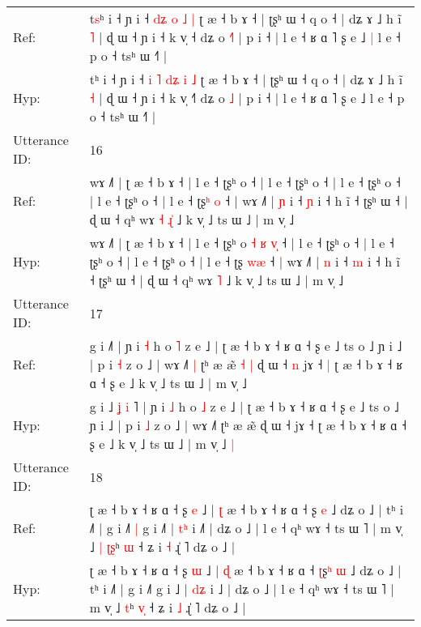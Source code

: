 \documentclass[10pt]{article}
\DeclareRobustCommand{\hl}[1]{{\textcolor{red}{#1}}}
\begin{document}
\begin{longtable}{ll}
Ref: & t\hl{s}ʰ i ˧ ɲ i ˧ \hl{}\hl{d}\hl{ʑ} \hl{}\hl{o} \hl{˩} \hl{|} ʈ æ ˧ b ɤ ˧ | ʈʂʰ ɯ ˧ q o ˧ | dʑ ɤ ˩ h ĩ \hl{˥} | ɖ ɯ ˧ ɲ i ˧ k v̩ ˧\hl{} dʑ o \hl{˧}\hl{˥} | p i ˧ | l e ˧ ʁ ɑ ˥ ʂ e ˩\hl{ }\hl{|} l e ˧ p o ˧ tsʰ ɯ ˧˥ |
 \\
Hyp: & t\hl{}ʰ i ˧ ɲ i ˧ \hl{i}\hl{ }\hl{˥} \hl{d}\hl{ʑ} \hl{i} \hl{˩} ʈ æ ˧ b ɤ ˧ | ʈʂʰ ɯ ˧ q o ˧ | dʑ ɤ ˩ h ĩ \hl{˧} | ɖ ɯ ˧ ɲ i ˧ k v̩ ˧\hl{˥} dʑ o \hl{}\hl{˩} | p i ˧ | l e ˧ ʁ ɑ ˥ ʂ e ˩\hl{}\hl{} l e ˧ p o ˧ tsʰ ɯ ˧˥ |
 \\
\midrule
Utterance ID: & 16 \\
Ref: & wɤ ˩˥ | ʈ æ ˧ b ɤ ˧ | l e ˧ ʈʂʰ o\hl{}\hl{}\hl{}\hl{}\hl{}\hl{}\hl{} ˧ | l e ˧ ʈʂʰ o ˧ | l e ˧ ʈʂʰ o ˧ | l e ˧ ʈʂʰ o ˧ | l e ˧ ʈʂ\hl{ʰ}\hl{ }\hl{o} ˧ | wɤ ˩˥ | \hl{ɲ} i ˧ \hl{ɲ} i ˧ h ĩ ˧ ʈʂʰ ɯ ˧ | ɖ ɯ ˧ qʰ wɤ\hl{ }\hl{˧} \hl{ɻ}\hl{̍} ˩ k v̩ ˩ ts ɯ ˩ | m v̩ ˩
 \\
Hyp: & wɤ ˩˥ | ʈ æ ˧ b ɤ ˧ | l e ˧ ʈʂʰ o\hl{ }\hl{˧}\hl{ }\hl{ʁ}\hl{ }\hl{v}\hl{̩} ˧ | l e ˧ ʈʂʰ o ˧ | l e ˧ ʈʂʰ o ˧ | l e ˧ ʈʂʰ o ˧ | l e ˧ ʈʂ\hl{ }\hl{w}\hl{æ} ˧ | wɤ ˩˥ | \hl{n} i ˧ \hl{m} i ˧ h ĩ ˧ ʈʂʰ ɯ ˧ | ɖ ɯ ˧ qʰ wɤ\hl{}\hl{} \hl{}\hl{˥} ˩ k v̩ ˩ ts ɯ ˩ | m v̩ ˩
 \\
\midrule
Utterance ID: & 17 \\
Ref: & g i ˩\hl{}\hl{}\hl{}\hl{}\hl{}˥ | ɲ i \hl{˧} h o \hl{˥} z e ˩ | ʈ æ ˧ b ɤ ˧ ʁ ɑ ˧ ʂ e ˩ ts o ˩ ɲ i ˩ | p i \hl{˧} z o ˩ | wɤ ˩˥\hl{ }\hl{|} ʈʰ æ æ̃\hl{ }\hl{˧}\hl{ }\hl{|} ɖ ɯ ˧\hl{ }\hl{n} jɤ ˧\hl{ }\hl{|} ʈ æ ˧ b ɤ ˧ ʁ ɑ ˧ ʂ e ˩ k v̩ ˩ ts ɯ ˩ | m v̩ ˩\hl{}\hl{}
 \\
Hyp: & g i ˩\hl{ }\hl{ʝ}\hl{ }\hl{i}\hl{ }˥ | ɲ i \hl{˩} h o \hl{˩} z e ˩ | ʈ æ ˧ b ɤ ˧ ʁ ɑ ˧ ʂ e ˩ ts o ˩ ɲ i ˩ | p i \hl{˩} z o ˩ | wɤ ˩˥\hl{}\hl{} ʈʰ æ æ̃\hl{}\hl{}\hl{}\hl{} ɖ ɯ ˧\hl{}\hl{} jɤ ˧\hl{}\hl{} ʈ æ ˧ b ɤ ˧ ʁ ɑ ˧ ʂ e ˩ k v̩ ˩ ts ɯ ˩ | m v̩ ˩\hl{ }\hl{|}
 \\
\midrule
Utterance ID: & 18 \\
Ref: & ʈ æ ˧ b ɤ ˧ ʁ ɑ ˧ ʂ \hl{e} ˩ | \hl{ʈ} æ ˧ b ɤ ˧ ʁ ɑ ˧ \hl{}ʂ\hl{} \hl{e} ˩ dʑ o ˩ | tʰ i ˩˥ | g i ˩˥\hl{ }\hl{|} g i ˩\hl{˥} | \hl{t}\hl{ʰ} i ˩\hl{˥} | dʑ o ˩ | l e ˧ qʰ wɤ ˧ ts ɯ ˥ | m v̩ ˩\hl{ }\hl{|} \hl{ʈ}\hl{ʂ}ʰ \hl{}\hl{ɯ} ˧ ʑ i \hl{˧} ɻ̍ ˥ dʑ o ˩ |
 \\
Hyp: & ʈ æ ˧ b ɤ ˧ ʁ ɑ ˧ ʂ \hl{ɯ} ˩ | \hl{ɖ} æ ˧ b ɤ ˧ ʁ ɑ ˧ \hl{ʈ}ʂ\hl{ʰ} \hl{ɯ} ˩ dʑ o ˩ | tʰ i ˩˥ | g i ˩˥\hl{}\hl{} g i ˩\hl{} | \hl{d}\hl{ʑ} i ˩\hl{} | dʑ o ˩ | l e ˧ qʰ wɤ ˧ ts ɯ ˥ | m v̩ ˩\hl{}\hl{} \hl{}\hl{t}ʰ \hl{v}\hl{̩} ˧ ʑ i \hl{˩} ɻ̍ ˥ dʑ o ˩ |
 \\

\end{longtable}
\end{document}
